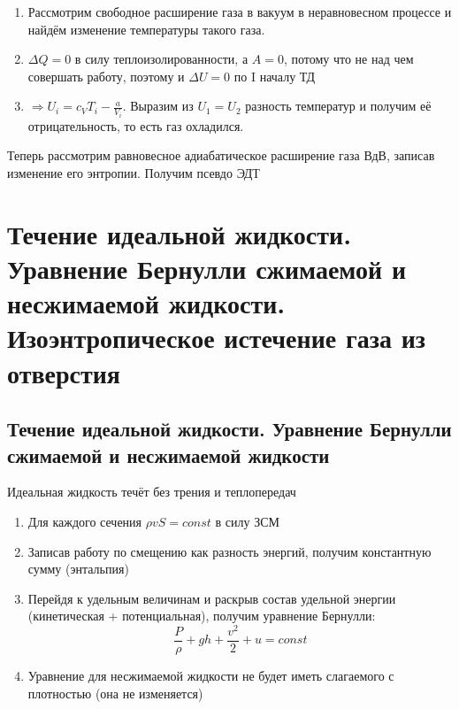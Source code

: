 \documentclass[a4paper, 14pt]{article}
\begin{document}
    \begin{enumerate}
        \item Рассмотрим свободное расширение газа в вакуум в неравновесном процессе и найдём изменение температуры
        такого газа.
        \item $\Delta Q = 0$ в силу теплоизолированности, а $A = 0$, потому что не над чем совершать работу, поэтому
        и $\Delta U = 0$ по I началу ТД
        \item $\Rightarrow U_i = c_V T_i - \frac{a}{V_i}$.
        Выразим из $U_1 = U_2$ разность температур и получим её отрицательность, то есть газ охладился.
    \end{enumerate}

    Теперь рассмотрим равновесное адиабатическое расширение газа ВдВ, записав изменение его энтропии.
    Получим псевдо ЭДТ

    \section{Течение идеальной жидкости.
    Уравнение Бернулли сжимаемой и несжимаемой жидкости.
    Изоэнтропическое истечение газа из отверстия}

    \subsection{Течение идеальной жидкости. Уравнение Бернулли сжимаемой и несжимаемой жидкости}

    Идеальная жидкость течёт без трения и теплопередач

    \begin{enumerate}
        \item Для каждого сечения $\rho vS = const$ в силу ЗСМ
        \item Записав работу по смещению как разность энергий, получим константную сумму (энтальпия)
        \item Перейдя к удельным величинам и раскрыв состав удельной энергии (кинетическая + потенциальная), получим
        уравнение Бернулли:
        \[ \frac{P}{\rho} + gh + \frac{v^2}{2} + u = const \]
        \item Уравнение для несжимаемой жидкости не будет иметь слагаемого с плотностью (она не изменяется)
    \end{enumerate}
\end{document}
